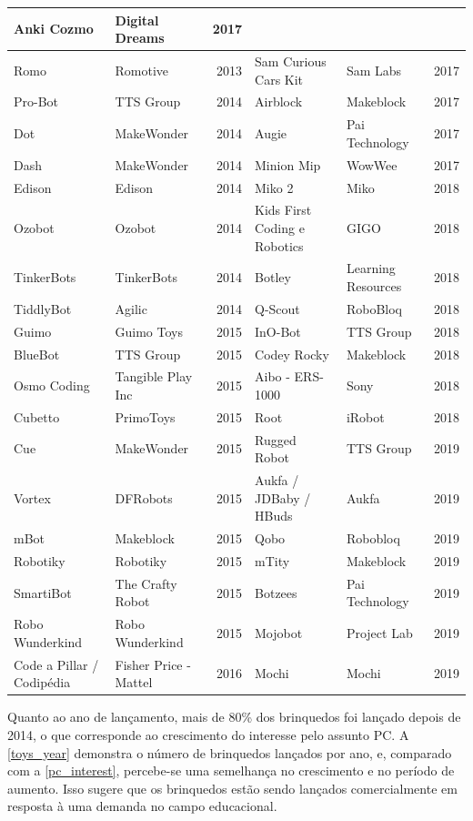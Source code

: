 {\begin{landscape}
\begin{small}
\begin{longtable}{|p{4.5cm} p{4.5cm} r| p{4.5cm} p{4.5cm} r|}
    Anki Cozmo & Digital Dreams & 2017 \\ \hline
    Romo & Romotive & 2013 &
    Sam Curious Cars Kit & Sam Labs & 2017 \\ \hline
    Pro-Bot & TTS Group & 2014 &
    Airblock & Makeblock & 2017 \\ \hline
    Dot & MakeWonder & 2014 &
    Augie & Pai Technology & 2017 \\ \hline
    Dash & MakeWonder & 2014 &
    Minion Mip & WowWee & 2017 \\ \hline
    Edison & Edison & 2014 &
    Miko 2 & Miko & 2018 \\ \hline
    Ozobot & Ozobot & 2014 &
    Kids First Coding e Robotics & GIGO & 2018 \\ \hline
    TinkerBots & TinkerBots & 2014 &
    Botley & Learning Resources & 2018 \\ \hline
    TiddlyBot & Agilic & 2014 &
    Q-Scout & RoboBloq & 2018 \\ \hline
    Guimo & Guimo Toys & 2015 &
    InO-Bot & TTS Group & 2018 \\ \hline
    BlueBot & TTS Group & 2015 &
    Codey Rocky & Makeblock & 2018 \\ \hline
    Osmo Coding & Tangible Play Inc & 2015 &
    Aibo - ERS-1000 & Sony & 2018 \\ \hline
    Cubetto & PrimoToys & 2015 &
    Root & iRobot & 2018 \\ \hline
    Cue & MakeWonder & 2015 &
    Rugged Robot & TTS Group & 2019 \\ \hline
    Vortex & DFRobots & 2015 &
    Aukfa / JDBaby / HBuds & Aukfa & 2019 \\ \hline
    mBot & Makeblock & 2015 &
    Qobo & Robobloq & 2019 \\ \hline
    Robotiky & Robotiky & 2015 &
    mTity & Makeblock & 2019 \\ \hline
    SmartiBot & The Crafty Robot & 2015 &
    Botzees & Pai Technology & 2019 \\ \hline
    Robo Wunderkind & Robo Wunderkind & 2015 &
    Mojobot & Project Lab & 2019 \\ \hline
    Code a Pillar / Codipédia & Fisher Price - Mattel & 2016 &
    Mochi & Mochi & 2019 \\ \hline
\end{longtable}
\end{small}
\end{landscape}

Quanto ao ano de lançamento, mais de 80\% dos brinquedos foi lançado depois de 2014, o que corresponde ao crescimento do interesse pelo assunto \acl{PC}. A \autoref{toys_year} demonstra o número de brinquedos lançados por ano, e, comparado com a \autoref{pc_interest}, percebe-se uma semelhança no crescimento e no período de aumento. Isso sugere que os brinquedos estão sendo lançados comercialmente em resposta à uma demanda no campo educacional.

}
